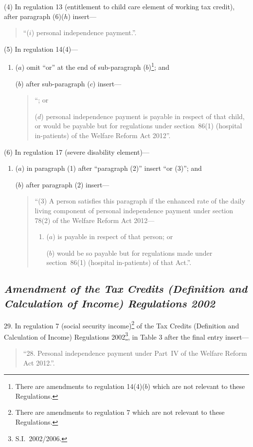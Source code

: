 \documentclass[12pt,a4paper]{article}
\begin{document}
(4) In regulation 13 (entitlement to child care element of working tax credit), after paragraph (6)($h$)  insert—
\begin{quotation}
“($i$) personal independence payment.”.
\end{quotation}

(5) In regulation 14(4)—
\begin{enumerate}\item[]
($a$) omit “or” at the end of sub-paragraph ($b$)\footnote{There are amendments to regulation 14(4)($b$)  which are not relevant to these Regulations.}; and

($b$) after sub-paragraph ($c$)  insert—
\begin{quotation}
“; or

($d$) personal independence payment is payable in respect of that child, or would be payable but for regulations under section~86(1) (hospital in-patients) of the Welfare Reform Act 2012”.
\end{quotation}
\end{enumerate}

(6) In regulation 17 (severe disability element)—
\begin{enumerate}\item[]
($a$) in paragraph (1) after “paragraph (2)” insert “or (3)”; and

($b$) after paragraph (2) insert—
\begin{quotation}
“(3) A person satisfies this paragraph if the enhanced rate of the daily living component of personal independence payment under section 78(2) of the Welfare Reform Act 2012—
\begin{enumerate}\item[]
($a$) is payable in respect of that person; or

($b$) would be so payable but for regulations made under section~86(1) (hospital in-patients) of that Act.”.
\end{enumerate}
\end{quotation}
\end{enumerate}

\subsection*{\itshape Amendment of the Tax Credits (Definition and Calculation of Income) Regulations 2002}

29.  In regulation 7 (social security income)\footnote{There are amendments to regulation 7 which are not relevant to these Regulations.} of the Tax Credits (Definition and Calculation of Income) Regulations 2002\footnote{S.I.~2002/2006.}, in Table 3 after the final entry insert—
\begin{quotation}
“28. Personal independence payment under Part~IV of the Welfare Reform Act 2012.”.
\end{quotation}
\end{document}
